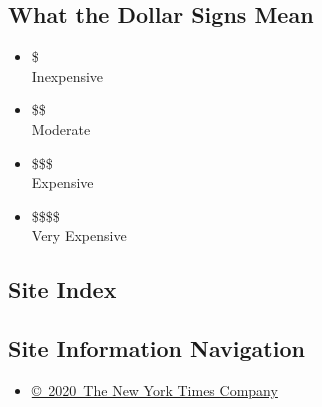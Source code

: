 \hypertarget{what-the-dollar-signs-mean}{%
\subsection{What the Dollar Signs
Mean}\label{what-the-dollar-signs-mean}}

\begin{itemize}
\tightlist
\item
  \$\\
  Inexpensive
\item
  \$\$\\
  Moderate
\item
  \$\$\$\\
  Expensive
\item
  \$\$\$\$\\
  Very Expensive
\end{itemize}

\hypertarget{site-index}{%
\subsection{Site Index}\label{site-index}}

\hypertarget{site-information-navigation}{%
\subsection{Site Information
Navigation}\label{site-information-navigation}}

\begin{itemize}
\tightlist
\item
  \href{https://help.nytimes3xbfgragh.onion/hc/en-us/articles/115014792127-Copyright-notice}{©~2020~The
  New York Times Company}
\end{itemize}

